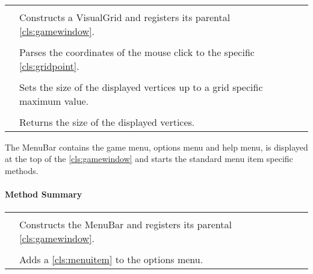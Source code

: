 \paragraph*{}
\begin{longtable}{Lp{10cm}}
	\startmethodtable
	 \\
	& Constructs a VisualGrid and registers its parental \ref{cls:gamewindow}. \\
	 \\
	& Parses the coordinates of the mouse click to the specific \ref{cls:gridpoint}. \\
	 \\
	& Sets the size of the displayed vertices up to a grid specific maximum value. \\
	 \\
	& Returns the size of the displayed vertices. \\ \hline
\end{longtable}


The MenuBar contains the game menu, options menu and help menu, is displayed at the top of the \ref{cls:gamewindow} and starts the standard menu item specific methods. \\ 
\centerdash

\paragraph*{Method Summary}
\paragraph*{}
\begin{longtable}{Lp{10cm}}
	\startmethodtable
	 \\
	& Constructs the MenuBar and registers its parental \ref{cls:gamewindow}. \\
	 \\
	& Adds a \ref{cls:menuitem} to the options menu. \\ \hline
\end{longtable}

